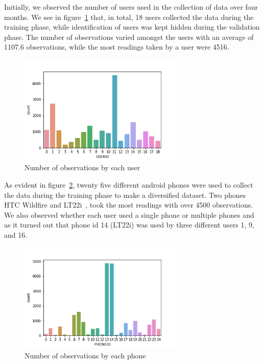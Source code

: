 \documentclass[a4paper,singleside,12pt]{report} %
\begin{document}
			Initially, we observed the number of users used in the collection of data over four months.
			We see in figure~\ref{fig4.2} that, in total, 18 users collected the data during the training phase, while identification of users was kept hidden during the validation phase. 
			The number of observations varied amongst the users with an average of 1107.6 observations, while the most readings taken by a user were 4516.
	
			\begin{figure}[h!]
			\centerline{\includegraphics[width=0.7\textwidth]{./figures/user_id_count_plot.png}}
			\caption{Number of observations by each user}
			\label{fig4.2}
			\end{figure}
	
			As evident in figure~\ref{fig4.3}, twenty five different android phones were used to collect the data during the training phase to make a diversified dataset. 
			Two phones HTC Wildfire and LT22i~\cite{ujiindoor-data}, took the most readings with over 4500 observations.
			We also observed whether each user used a single phone or multiple phones and as it turned out that phone id 14 (LT22i) was used by three different users 1, 9, and 16.
	
	
			\begin{figure}[h!]
			\centerline{\includegraphics[width=0.7\textwidth]{./figures/phone_id_count_plot.png}}
			\caption{Number of observations by each phone}
			\label{fig4.3}
			\end{figure}
	
\end{document}
